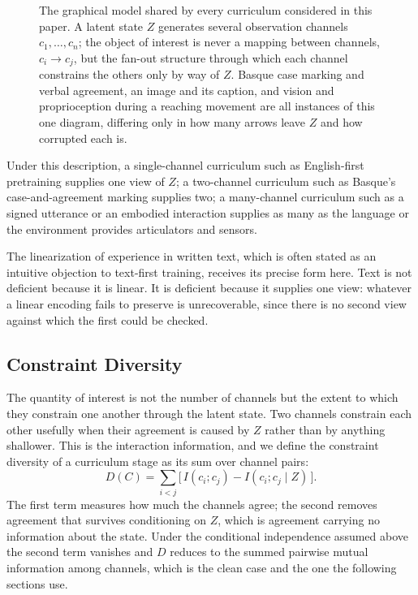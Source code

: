\documentclass[11pt]{article}
\begin{document}
\begin{figure}[h]
\centering
{}
\caption{The graphical model shared by every curriculum considered in this paper. A latent state $Z$ generates several observation channels $c_1,\ldots,c_n$; the object of interest is never a mapping between channels, $c_i \to c_j$, but the fan-out structure through which each channel constrains the others only by way of $Z$. Basque case marking and verbal agreement, an image and its caption, and vision and proprioception during a reaching movement are all instances of this one diagram, differing only in how many arrows leave $Z$ and how corrupted each is.}
\label{fig:latent}
\end{figure}
 Under this description, a single-channel curriculum such as English-first pretraining supplies one view of $Z$; a two-channel curriculum such as Basque's case-and-agreement marking supplies two; a many-channel curriculum such as a signed utterance or an embodied interaction supplies as many as the language or the environment provides articulators and sensors.

The linearization of experience in written text, which is often stated as an intuitive objection to text-first training, receives its precise form here. Text is not deficient because it is linear. It is deficient because it supplies one view: whatever a linear encoding fails to preserve is unrecoverable, since there is no second view against which the first could be checked.

\subsection{Constraint Diversity}

The quantity of interest is not the number of channels but the extent to which they constrain one another through the latent state. Two channels constrain each other usefully when their agreement is caused by $Z$ rather than by anything shallower. This is the interaction information, and we define the constraint diversity of a curriculum stage as its sum over channel pairs:
\[
D(C)=\sum_{i<j}\Big[\,I(c_i;c_j)-I(c_i;c_j\mid Z)\,\Big].
\]
The first term measures how much the channels agree; the second removes agreement that survives conditioning on $Z$, which is agreement carrying no information about the state. Under the conditional independence assumed above the second term vanishes and $D$ reduces to the summed pairwise mutual information among channels, which is the clean case and the one the following sections use.
\end{document}
